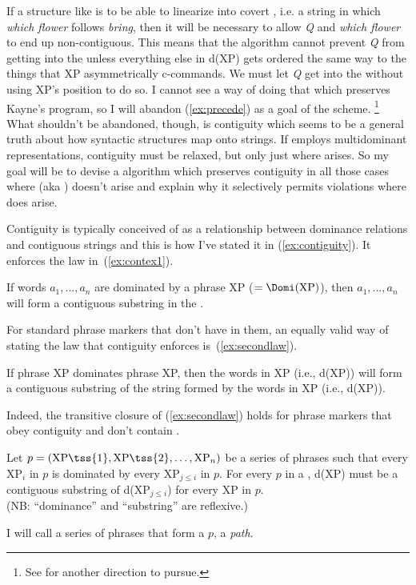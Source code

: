 \documentclass[output=paper]{langsci/langscibook}
\begin{document}
If a structure like  is to be able to linearize into covert , i.e. a string in which \emph{which flower} follows \emph{bring}, then it will be necessary to allow \emph{Q} and \emph{which flower} to end up non-contiguous. This means that the  algorithm cannot prevent \emph{Q} from getting into the  unless everything else in d(XP) gets ordered the same way to the things that XP asymmetrically c-commands. We must let \emph{Q} get into the  without using XP's position to do so. I cannot see a way of doing that which preserves Kayne's program, so I will abandon (\ref{ex:precede}) as a goal of the  scheme.%
\footnote{See \cite{AbeNee2012} for another direction to pursue.} %
What shouldn't be abandoned, though, is contiguity which seems to be a general truth about how syntactic structures map onto strings. If  employs multidominant representations, contiguity must be relaxed, but only just where  arises. So my goal will be to devise a  algorithm which preserves contiguity in all those cases where  (aka ) doesn't arise and explain why it selectively permits violations where  does arise.

Contiguity is typically conceived of as a relationship between dominance relations and contiguous strings and this is how I've stated it in (\ref{ex:contiguity}). It enforces the law in~(\ref{ex:contex1}).

\begin{exe}
	\ex \label{ex:contex1}
	If words $a_1,\ldots,a_n$ are dominated by a phrase XP ($=\Domi(\text{XP})$), then $a_1,\ldots,a_n$ will form a contiguous substring in the .
\end{exe}

For standard phrase markers that don't have  in them, an equally valid way of stating the law that contiguity enforces is~(\ref{ex:secondlaw}).
\begin{exe}
	\ex \label{ex:secondlaw}
	If phrase XP dominates phrase XP, then the words in XP (i.e., d(XP)) will form a contiguous substring of the string formed by the words in XP (i.e., d(XP)).
\end{exe}

Indeed, the transitive closure of (\ref{ex:secondlaw}) holds for phrase markers that obey contiguity and don't contain .
\begin{exe}
	\ex \label{ex:thirdlaw}
	Let $p=(\text{XP\tss{1}}, \text{XP\tss{2}},\ldots,\text{XP}_n)$ be a series of phrases such that every XP$_i$ in $p$ is dominated by every XP$_{j \leq i}$ in $p$. For every $p$ in a , d(XP) must be a contiguous substring of d(XP$_{j \leq i}$) for every XP in $p$.\\[8pt]
	(NB: ``dominance'' and ``substring'' are reflexive.)
\end{exe}
I will call a series of phrases that form a $p$, a \emph{path}.
\end{document}
